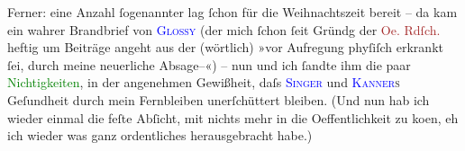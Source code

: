 \pstart
           Ferner: eine Anzahl ſogenannter \label{K_L03001-2v}\label{K_L03001-2h} lag ſchon für die
               Weihnachtszeit bereit – da kam ein wahrer Brandbrief von \textsc{\textcolor{blue}{Glossy}{}\ledrightnote{\textcolor{blue}{Karl Glossy}}} (der mich ſchon ſeit Gründg der \textcolor{brown}{Oe. Rdſch.}{}\ledrightnote{\textcolor{brown}{Österreichische Rundschau}}
               heftig um Beiträge angeht aus der (wörtlich) »vor Aufregung phyſiſch {\pb}erkrankt ſei, durch meine neuerliche
               Absage–«) – nun und ich ſandte ihm die paar \textcolor{green}{Nichtigkeiten}{}\ledrightnote{{$\rightarrow$}\textcolor{green}{Bemerkungen}}, in der angenehmen Gewißheit, daſs \textsc{\textcolor{blue}{Singer}{}\ledrightnote{\textcolor{blue}{Isidor Singer}}} und \textsc{\textcolor{blue}{Kanner}{}\ledrightnote{\textcolor{blue}{Heinrich Kanner}}s} Geſundheit durch mein
               Fernbleiben unerſchüttert bleiben. (Und nun hab ich wieder einmal die feſte Abſicht,
               mit nichts mehr in die Oeffentlichkeit zu ko{\geminationm}en, eh ich
               wieder was ganz ordentliches herausgebracht habe.)\pend
           
